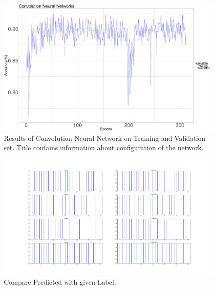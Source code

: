 \documentclass[a4paper]{article}
\begin{document}
\begin{figure}  
\centering
\includegraphics[width=1.0\textwidth]{CNN_1.png}
\caption{\label{fig:CNN_1}Results of Convolution Neural Network on Training and Validation set. Title contains information about configuration of the network.}
\end{figure}



\begin{figure}  
\centering
\includegraphics[width=1.0\textwidth]{CompareLabelNPrediction.png}
\caption{\label{fig:comapre}Compare Predicted with given Label.}
\end{figure}






\end{document}
